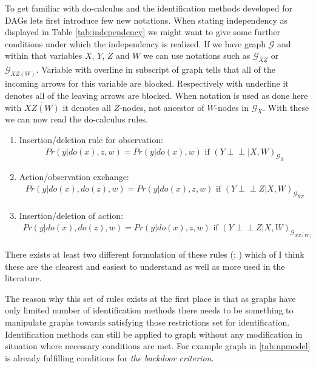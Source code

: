 \documentclass[main=english,12pt,a4paper,pdftex,econ,utf8]{aaltothesis}
\newcommand{\indep}{\perp \!\!\! \perp}
\newcommand{\g}{\mathcal{G}}
\begin{document}
To get familiar with do-calculus and the identification methods developed for DAGs lets first introduce few new notations. When stating independency as displayed in Table \ref{tab:independency} we might want to give some further conditions under which the independency is realized. If we have graph $\g$ and within that variables $X$, $Y$, $Z$ and $W$ we can use notations such as $\g_{\overline{X}\underline{Z}}$ or $\g_{\overline{XZ(W)}}$. Variable with overline in subscript of graph tells that all of the incoming arrows for this variable are blocked. Respectively with underline it denotes all of the leaving arrows are blocked. When notation is used as done here with $\overline{XZ(W)}$ it denotes all $Z$-nodes, not ancestor of $W$-nodes in $\g_{\overline{X}}$. With these we can now read the do-calculus rules.

\begin{enumerate}
    \item Insertion/deletion rule for observation:
        \begin{gather} \label{eq:do1}
            Pr(y|do(x),z,w)=Pr(y|do(x),w)\text{ if }(Y\indep |X,W)_{\g_{\overline{X}}}
        \end{gather}
    \item Action/observation exchange:
        \begin{gather} \label{eq:do2}
            Pr(y|do(x), do(z), w)=Pr(y|do(x),z,w)\text{ if }(Y\indep Z|X,W)_{\g_{\overline{X}\underline{Z}}}
        \end{gather}
    \item Insertion/deletion of action:
        \begin{gather} \label{eq:do3}
            Pr(y|do(x),do(z),w)=Pr(y|do(x),z,w)\text{ if }(Y\indep Z|X,W)_{\g_{\overline{XZ(W)}}}
        \end{gather}
\end{enumerate}

\noindent There exists at least two different formulation of these rules (\cite{Jud1995}; \cite{Pearl2009a}) which of I think these are the clearest and easiest to understand as well as more used in the literature.

The reason why this set of rules exists at the first place is that as graphs have only limited number of identification methods there needs to be something to manipulate graphs towards satisfying those restrictions set for identification. Identification methods can still be applied to graph without any modification in situation where necessary conditions are met. For example graph in \ref{tab:npmodel} is already fulfilling conditions for \textit{the backdoor criterion}.
\end{document}
